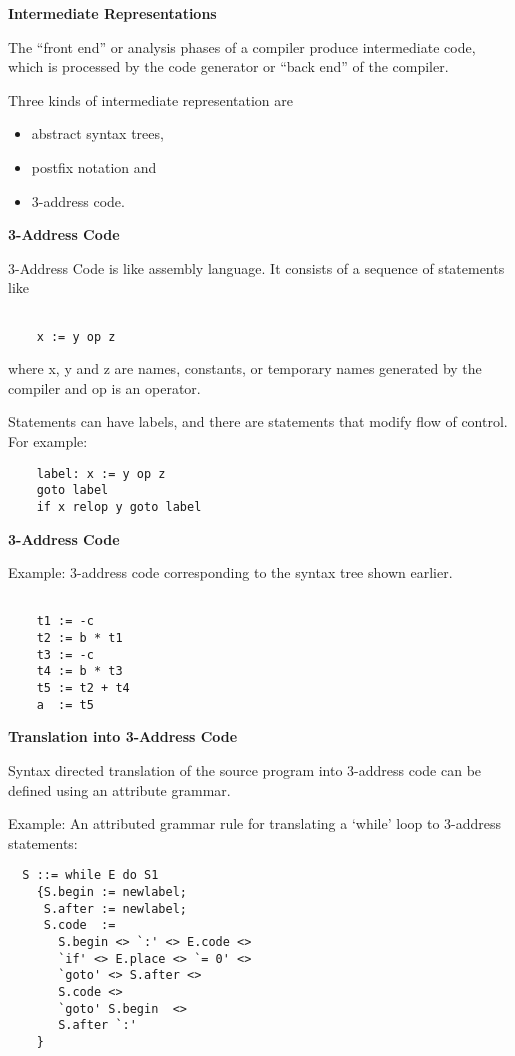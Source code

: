 %
%
\begin{slide}{}
{\bf Intermediate Representations}

The ``front end'' or analysis phases of a compiler
produce intermediate code, which is processed
by the code generator or ``back end'' of the compiler.

Three kinds of intermediate representation are
\begin{itemize}
\item abstract syntax trees,
\item postfix notation and
\item 3-address code.
\end{itemize}
\end{slide}
%
%
\begin{slide}{}
{\bf 3-Address Code}

3-Address Code is like assembly language.  It consists of a
sequence of statements like
\begin{verbatim}

    x := y op z

\end{verbatim}
where x, y and z are names, constants, or temporary names generated
by the compiler and op is an operator.

Statements can have labels, and there are statements that modify
flow of control.  For example:  
\begin{verbatim}
    label: x := y op z
    goto label  
    if x relop y goto label
\end{verbatim}
\end{slide}
%
%
\begin{slide}{}
{\bf 3-Address Code}

Example: 3-address code corresponding to the syntax
tree shown earlier.
\begin{verbatim}

    t1 := -c
    t2 := b * t1
    t3 := -c
    t4 := b * t3
    t5 := t2 + t4
    a  := t5

\end{verbatim}
\end{slide}
%
%
\begin{slide}{}
{\bf Translation into 3-Address Code}

Syntax directed translation of the source program into
3-address code can be defined using an attribute grammar.

Example: An attributed grammar rule for translating a
`while' loop to 3-address statements:               
\begin{verbatim}
  S ::= while E do S1
    {S.begin := newlabel;
     S.after := newlabel;
     S.code  :=
       S.begin <> `:' <> E.code <>
       `if' <> E.place <> `= 0' <>
       `goto' <> S.after <>
       S.code <>
       `goto' S.begin  <>
       S.after `:'
    }
\end{verbatim}
\end{slide}
